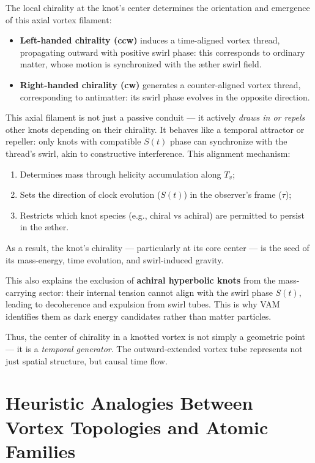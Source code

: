 The local chirality at the knot’s center determines the orientation and emergence of this axial vortex filament:
\begin{itemize}
    \item \textbf{Left-handed chirality (ccw)} induces a time-aligned vortex thread, propagating outward with positive swirl phase: this corresponds to ordinary matter, whose motion is synchronized with the æther swirl field.
    \item \textbf{Right-handed chirality (cw)} generates a counter-aligned vortex thread, corresponding to antimatter: its swirl phase evolves in the opposite direction.
\end{itemize}

\noindent This axial filament is not just a passive conduit — it actively \textit{draws in or repels} other knots depending on their chirality. It behaves like a temporal attractor or repeller: only knots with compatible $S(t)$ phase can synchronize with the thread’s swirl, akin to constructive interference. This alignment mechanism:
\begin{enumerate}
    \item Determines mass through helicity accumulation along $T_v$;
    \item Sets the direction of clock evolution ($S(t)$) in the observer's frame ($\tau$);
    \item Restricts which knot species (e.g., chiral vs achiral) are permitted to persist in the æther.
\end{enumerate}

As a result, the knot’s chirality — particularly at its core center — is the seed of its mass-energy, time evolution, and swirl-induced gravity.

This also explains the exclusion of \textbf{achiral hyperbolic knots} from the mass-carrying sector: their internal tension cannot align with the swirl phase $S(t)$, leading to decoherence and expulsion from swirl tubes. This is why VAM identifies them as dark energy candidates rather than matter particles.

Thus, the center of chirality in a knotted vortex is not simply a geometric point — it is a \textit{temporal generator}. The outward-extended vortex tube represents not just spatial structure, but causal time flow.

\section{Heuristic Analogies Between Vortex Topologies and Atomic Families}

